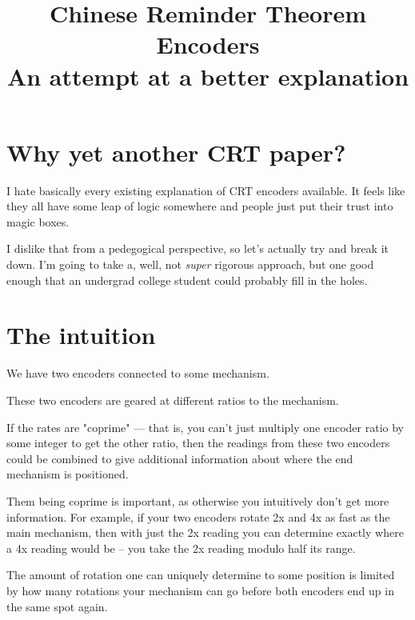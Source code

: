 \documentclass[11pt]{article}
\title{
    Chinese Reminder Theorem Encoders\\
    \large An attempt at a better explanation
}
\author{\Name} %
\begin{document}
\maketitle

\section{Why yet another CRT paper?}

I hate basically every existing explanation of CRT encoders available.
It feels like they all have some leap of logic somewhere and people just put their trust into magic boxes.

\noindent I dislike that from a pedegogical perspective, so let's actually try and break it down.
I'm going to take a, well, not \textit{super} rigorous approach, but one good enough that an undergrad college student could probably fill in the holes. 

\section{The intuition}

We have two encoders connected to some mechanism.
\begin{figure}[ht]
    \center
\end{figure}

\noindent These two encoders are geared at different ratios to the mechanism.

If the rates are "coprime" --- that is, you can't just multiply one encoder ratio by some integer to get the other ratio, then the readings from these two encoders could be combined to give additional information about where the end mechanism is positioned. 

Them being coprime is important, as otherwise you intuitively don't get more information. For example, if your two encoders rotate 2x and 4x as fast as the main mechanism, then with just the 2x reading you can determine exactly where a 4x reading would be -- you take the 2x reading modulo half its range.

The amount of rotation one can uniquely determine to some position is limited by how many rotations your mechanism can go before both encoders end up in the same spot again.
\end{document}

